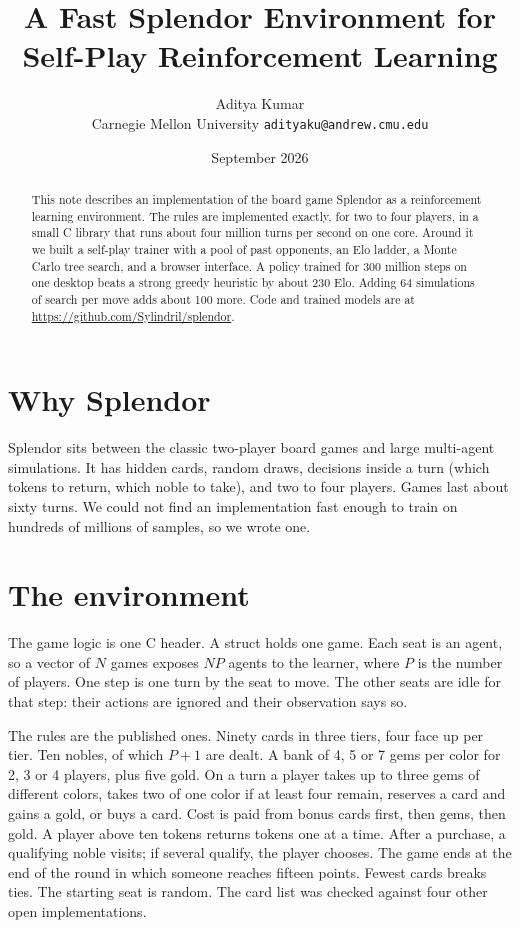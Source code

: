 \documentclass[11pt]{article}
\title{A Fast Splendor Environment for Self-Play Reinforcement Learning}
\author{Aditya Kumar\\ \small Carnegie Mellon University \quad \texttt{adityaku@andrew.cmu.edu}}
\date{September 2026}
\begin{document}
\maketitle

\begin{abstract}
This note describes an implementation of the board game Splendor as a reinforcement
learning environment. The rules are implemented exactly, for two to four players, in a small
C library that runs about four million turns per second on one core. Around it we built a
self-play trainer with a pool of past opponents, an Elo ladder, a Monte Carlo tree search,
and a browser interface. A policy trained for 300 million steps on one desktop beats a strong
greedy heuristic by about 230 Elo. Adding 64 simulations of search per move adds about 100
more. Code and trained models are at \url{https://github.com/Sylindril/splendor}.
\end{abstract}

\section{Why Splendor}
Splendor sits between the classic two-player board games and large multi-agent
simulations. It has hidden cards, random draws, decisions inside a turn (which tokens to
return, which noble to take), and two to four players. Games last about sixty turns. We could
not find an implementation fast enough to train on hundreds of millions of samples, so we
wrote one.

\section{The environment}
The game logic is one C header. A struct holds one game. Each seat is an agent, so a vector
of $N$ games exposes $NP$ agents to the learner, where $P$ is the number of players. One step
is one turn by the seat to move. The other seats are idle for that step: their actions are
ignored and their observation says so.

The rules are the published ones. Ninety cards in three tiers, four face up per tier. Ten
nobles, of which $P+1$ are dealt. A bank of 4, 5 or 7 gems per color for 2, 3 or 4 players,
plus five gold. On a turn a player takes up to three gems of different colors, takes two of
one color if at least four remain, reserves a card and gains a gold, or buys a card. Cost is
paid from bonus cards first, then gems, then gold. A player above ten tokens returns tokens
one at a time. After a purchase, a qualifying noble visits; if several qualify, the player
chooses. The game ends at the end of the round in which someone reaches fifteen points.
Fewest cards breaks ties. The starting seat is random. The card list was checked against four
other open implementations.
\end{document}
